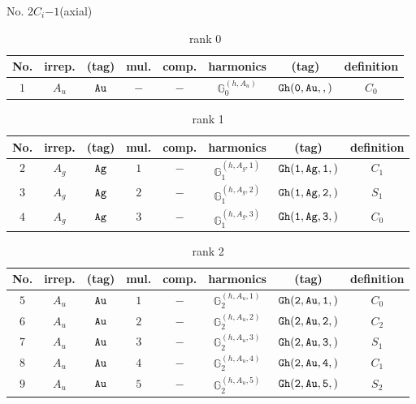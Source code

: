 \documentclass[fleqn,8pt]{jsarticle}
\begin{document}
\setcounter{MaxMatrixCols}{16}

\begin{center}
\LARGE
No. 2\quad$C_{i}$\quad$-1$\quad[ triclinic ] (axial)
\end{center}
\begin{table}[ht!]
\begin{center}
\caption{rank 0}
\renewcommand{\arraystretch}{1.3}
\begin{tabular}{cccccccc} \hline \hline
No. & irrep. & (tag) & mul. & comp. & harmonics & (tag) & definition \\ \hline
$ 1 $ & $ A_{u} $ & $ {\tt Au} $ & $ - $ & $ - $ & $ \mathbb{G}_{0}^{(h,A_{u})} $ & $ {\tt Gh(0,Au,,)} $ & $ C_{0} $ \\
 \hline \hline
\end{tabular}
\end{center}
\end{table}
\begin{table}[ht!]
\begin{center}
\caption{rank 1}
\renewcommand{\arraystretch}{1.3}
\begin{tabular}{cccccccc} \hline \hline
No. & irrep. & (tag) & mul. & comp. & harmonics & (tag) & definition \\ \hline
$ 2 $ & $ A_{g} $ & $ {\tt Ag} $ & $ 1 $ & $ - $ & $ \mathbb{G}_{1}^{(h,A_{g},1)} $ & $ {\tt Gh(1,Ag,1,)} $ & $ C_{1} $ \\
$ 3 $ & $ A_{g} $ & $ {\tt Ag} $ & $ 2 $ & $ - $ & $ \mathbb{G}_{1}^{(h,A_{g},2)} $ & $ {\tt Gh(1,Ag,2,)} $ & $ S_{1} $ \\
$ 4 $ & $ A_{g} $ & $ {\tt Ag} $ & $ 3 $ & $ - $ & $ \mathbb{G}_{1}^{(h,A_{g},3)} $ & $ {\tt Gh(1,Ag,3,)} $ & $ C_{0} $ \\
 \hline \hline
\end{tabular}
\end{center}
\end{table}
\begin{table}[ht!]
\begin{center}
\caption{rank 2}
\renewcommand{\arraystretch}{1.3}
\begin{tabular}{cccccccc} \hline \hline
No. & irrep. & (tag) & mul. & comp. & harmonics & (tag) & definition \\ \hline
$ 5 $ & $ A_{u} $ & $ {\tt Au} $ & $ 1 $ & $ - $ & $ \mathbb{G}_{2}^{(h,A_{u},1)} $ & $ {\tt Gh(2,Au,1,)} $ & $ C_{0} $ \\
$ 6 $ & $ A_{u} $ & $ {\tt Au} $ & $ 2 $ & $ - $ & $ \mathbb{G}_{2}^{(h,A_{u},2)} $ & $ {\tt Gh(2,Au,2,)} $ & $ C_{2} $ \\
$ 7 $ & $ A_{u} $ & $ {\tt Au} $ & $ 3 $ & $ - $ & $ \mathbb{G}_{2}^{(h,A_{u},3)} $ & $ {\tt Gh(2,Au,3,)} $ & $ S_{1} $ \\
$ 8 $ & $ A_{u} $ & $ {\tt Au} $ & $ 4 $ & $ - $ & $ \mathbb{G}_{2}^{(h,A_{u},4)} $ & $ {\tt Gh(2,Au,4,)} $ & $ C_{1} $ \\
$ 9 $ & $ A_{u} $ & $ {\tt Au} $ & $ 5 $ & $ - $ & $ \mathbb{G}_{2}^{(h,A_{u},5)} $ & $ {\tt Gh(2,Au,5,)} $ & $ S_{2} $ \\
 \hline \hline
\end{tabular}
\end{center}
\end{table}
\end{document}
